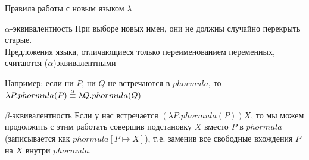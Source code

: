  \begin{frame}{Правила работы с новым языком $\lambda$}
 	\begin{block}{$\alpha$-эквивалентность}
 		При выборе новых имен, они не должны случайно перекрыть старые.\\
 		Предложения языка, отличающиеся только переименованием переменных, считаются ($\alpha$)эквивалентными
 	\end{block}
 	Например:  если ни $P$, ни $Q$ не встречаются в $phormula$, то $\lambda P. phormula(P)  \overset{\alpha}{\equiv}{} \lambda Q. phormula(Q) $

 	\begin{block}{$\beta$-эквивалентность}
 		Если у нас встречается $(\lambda P. phormula(P))X$, то мы можем продолжить с этим работать совершив подстановку $X$ вместо $P$ в $phormula$ (записывается как $phormula[P\mapsto X]$), т.е. заменив все свободные вхождения $P$ на $X$ внутри $phormula$.
 	\end{block}
 \end{frame}


